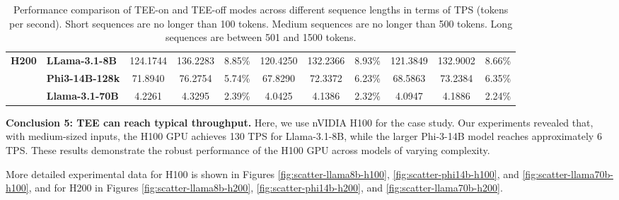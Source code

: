 \documentclass{article}
\begin{document}
\begin{table}[htbp]
{\begin{tabular}{llccc|ccc|ccc}
            \midrule
            \multirow{3}{*}{\textbf{H200}} & \textbf{LLama-3.1-8B}  & 124.1744                                            & 136.2283                                             & 8.85\%                                             & 120.4250        & 132.2366         & 8.93\%                                                                     & 121.3849        & 132.9002         & 8.66\%                                                                     \\
                                           & \textbf{Phi3-14B-128k} & 71.8940                                             & 76.2754                                              & 5.74\%                                             & 67.8290         & 72.3372          & 6.23\%                                                                     & 68.5863         & 73.2384          & 6.35\%                                                                     \\
                                           & \textbf{Llama-3.1-70B} & 4.2261                                              & 4.3295                                               & 2.39\%                                             & 4.0425          & 4.1386           & 2.32\%                                                                     & 4.0947          & 4.1886           & 2.24\%                                                                     \\
            \bottomrule
        \end{tabular}%
    }
    \caption{Performance comparison of TEE-on and TEE-off modes across different sequence lengths in terms of TPS (tokens per second). Short sequences are no longer than 100 tokens. Medium sequences are no longer than 500 tokens. Long sequences are between 501 and 1500 tokens.}
    \label{tab:tps_short_medium_long}
\end{table}

\noindent\textbf{Conclusion 5: TEE can reach typical throughput.}
Here, we use nVIDIA H100 for the case study. Our experiments revealed that, with medium-sized inputs, the H100 GPU achieves 130 TPS for Llama-3.1-8B, while the larger Phi-3-14B model reaches approximately 6 TPS. These results demonstrate the robust performance of the H100 GPU across models of varying complexity.

More detailed experimental data for H100 is shown in Figures \ref{fig:scatter-llama8b-h100}, \ref{fig:scatter-phi14b-h100}, and \ref{fig:scatter-llama70b-h100}, and for H200 in Figures \ref{fig:scatter-llama8b-h200}, \ref{fig:scatter-phi14b-h200}, and \ref{fig:scatter-llama70b-h200}.
\end{document}
